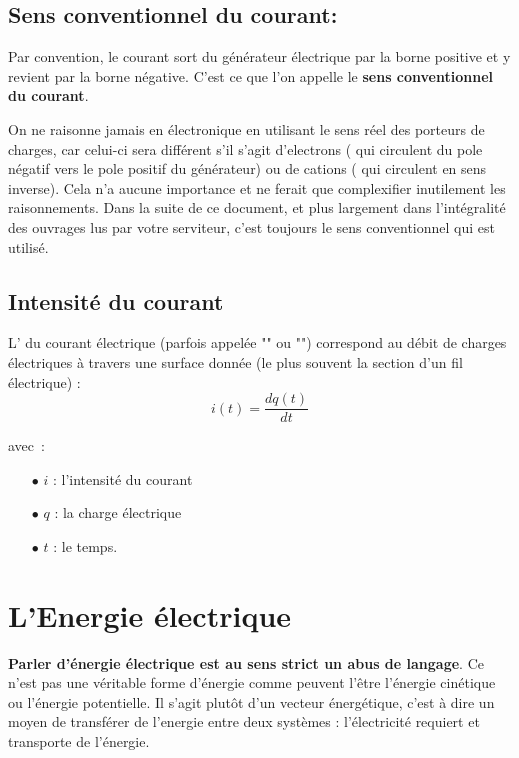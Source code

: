 \subsection*{ Sens conventionnel du courant: }

Par convention, le courant sort du générateur électrique par la borne positive et y revient par la borne négative. C'est ce que l'on appelle le \textbf{sens conventionnel du courant}. \\

On ne raisonne jamais en électronique en utilisant le sens réel des porteurs de charges, car celui-ci sera différent s'il s'agit d'electrons ( qui circulent du pole négatif vers le pole positif du générateur) ou de cations ( qui circulent en sens inverse). Cela n'a aucune importance et ne ferait que complexifier inutilement les raisonnements. Dans la suite de ce document, et plus largement dans l'intégralité des ouvrages lus par votre serviteur, c'est toujours le sens conventionnel qui est utilisé.

\subsection*{Intensité du courant}

L' du courant électrique (parfois appelée "" ou "") correspond au débit de charges électriques à travers une surface donnée (le plus souvent la section d'un fil électrique) : \\

\begin{equation}
	i(t) = \dfrac{dq(t)}{dt} 
\end{equation}

avec~: \\
\begin{itemize}
	\item[$\bullet$] $i$ : l'intensité du courant
	\item[$\bullet$] $q$ : la charge électrique
	\item[$\bullet$] $t$ : le temps.
\end{itemize}

\section{L'Energie électrique}


\textbf{Parler d'énergie électrique est au sens strict un abus de langage}. Ce n'est pas une véritable forme d'énergie comme peuvent l'être l'énergie cinétique ou l'énergie potentielle. Il s'agit plutôt d'un vecteur énergétique, c'est à dire un moyen de transférer de l'energie entre deux systèmes : l'électricité requiert et transporte de l'énergie. \\

